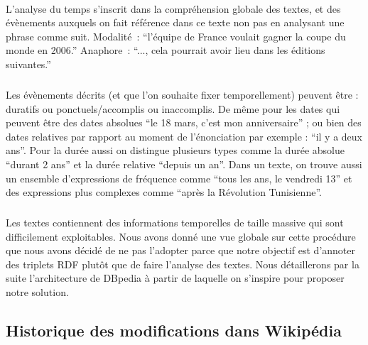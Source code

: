 \documentclass[12pt,a4	]{report}
\begin{document}
\paragraph{}
L’analyse du temps s’inscrit dans la compréhension globale des textes, et des évènements auxquels on fait référence dans ce texte non pas en analysant une phrase comme suit. 
\newline
Modalité~: ``l’équipe de France voulait gagner la coupe du monde en 2006.'' 
\newline
Anaphore~:  ``..., cela pourrait avoir lieu dans les éditions suivantes.''
\subparagraph{}
Les évènements décrits (et que l’on souhaite fixer temporellement) peuvent être : duratifs ou ponctuels/accomplis ou inaccomplis. 
De même pour les dates qui peuvent être des dates absolues ``le 18 mars, c'est mon anniversaire'' ; ou bien des dates relatives par rapport au moment de l’énonciation par exemple : ``il y a deux ans''. Pour la durée aussi on distingue plusieurs types comme la durée absolue ``durant 2 ans'' et la durée relative ``depuis un an''. Dans un texte, on trouve aussi un ensemble d'expressions de fréquence comme ``tous les ans, le vendredi 13'' et des expressions plus complexes comme ``après la Révolution Tunisienne''.
\subparagraph{}
Les textes contiennent des informations temporelles de taille massive qui sont difficilement exploitables. Nous avons donné une vue globale sur cette procédure que nous avons décidé de ne pas l'adopter parce que notre objectif est d'annoter des triplets RDF plutôt que de faire l'analyse des textes. Nous détaillerons par la suite l'architecture de DBpedia à partir de laquelle on s'inspire pour proposer notre solution.
\subsection{Historique des modifications dans Wikipédia}
\end{document}
